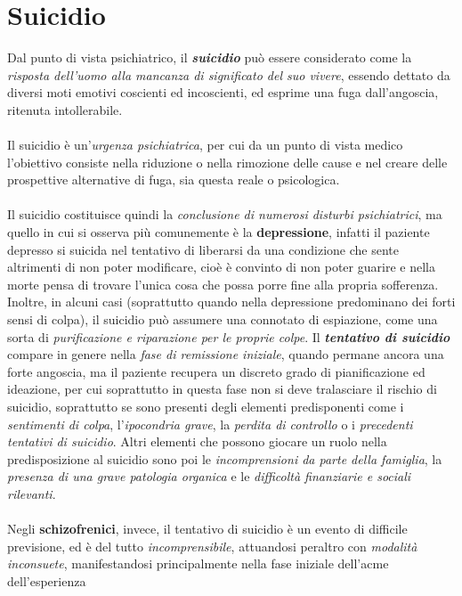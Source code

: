 \section{Suicidio}

Dal punto di vista psichiatrico, il \textbf{\emph{suicidio}} può essere
considerato come la \emph{risposta dell'uomo alla mancanza di
significato del suo vivere}, essendo dettato da diversi moti emotivi
coscienti ed incoscienti, ed esprime una fuga dall'angoscia, ritenuta
intollerabile.
\\\\
Il suicidio è un'\emph{urgenza psichiatrica}, per cui da un punto di
vista medico l'obiettivo consiste nella riduzione o nella rimozione
delle cause e nel creare delle prospettive alternative di fuga, sia
questa reale o psicologica.
\\\\
Il suicidio costituisce quindi la \emph{conclusione di numerosi disturbi
psichiatrici}, ma quello in cui si osserva più comunemente è la
\textbf{depressione}, infatti il paziente depresso si suicida nel
tentativo di liberarsi da una condizione che sente altrimenti di non
poter modificare, cioè è convinto di non poter guarire e nella morte
pensa di trovare l'unica cosa che possa porre fine alla propria
sofferenza. Inoltre, in alcuni casi (soprattutto quando nella
depressione predominano dei forti sensi di colpa), il suicidio può
assumere una connotato di espiazione, come una sorta di
\emph{purificazione e riparazione per le proprie colpe}. Il
\textbf{\emph{tentativo di suicidio}} compare in genere nella \emph{fase
di remissione iniziale}, quando permane ancora una forte angoscia, ma il
paziente recupera un discreto grado di pianificazione ed ideazione, per
cui soprattutto in questa fase non si deve tralasciare il rischio di
suicidio, soprattutto se sono presenti degli elementi predisponenti come
i \emph{sentimenti di colpa}, l'\emph{ipocondria grave}, la
\emph{perdita di controllo} o i \emph{precedenti tentativi di suicidio}.
Altri elementi che possono giocare un ruolo nella predisposizione al
suicidio sono poi le \emph{incomprensioni da parte della famiglia}, la
\emph{presenza di una grave patologia organica} e le \emph{difficoltà
finanziarie e sociali rilevanti}.
\\\\
Negli \textbf{schizofrenici}, invece, il tentativo di suicidio è un
evento di difficile previsione, ed è del tutto \emph{incomprensibile},
attuandosi peraltro con \emph{modalità inconsuete}, manifestandosi
principalmente nella fase iniziale dell'acme dell'esperienza
